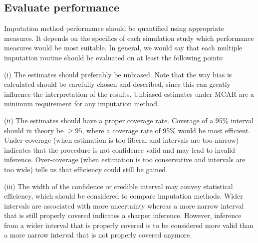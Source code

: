 \documentclass[bimj,fleqn]{w-art}
\begin{document}

\subsection{Evaluate performance}


Imputation method performance should be quantified using appropriate measures. It depends on the specifics of each simulation study which performance measures would be most suitable. In general, we would say that each multiple imputation routine should be evaluated on at least the following points: 

(i) The estimates should preferably be unbiased. Note that the way bias is calculated should be carefully chosen and described, since this can greatly influence the interpretation of the results. Unbiased estimates under MCAR are a minimum requirement for any imputation method.

(ii) The estimates should have a proper coverage rate. Coverage of a 95\% interval should in theory be $\geq 95$, where a coverage rate of 95\% would be most efficient. Under-coverage (when estimation is too liberal and intervals are too narrow) indicates that the procedure is not confidence valid and may lead to invalid inference. Over-coverage (when estimation is too conservative and intervals are too wide) tells us that efficiency could still be gained. 

(iii) The width of the confidence or credible interval may convey statistical efficiency, which should be considered to compare imputation methods. Wider intervals are associated with more uncertainty whereas a more narrow interval that is still properly covered indicates a sharper inference. However, inference from a wider interval that is properly covered is to be considered more valid than a more narrow interval that is not properly covered anymore. 
\end{document}
